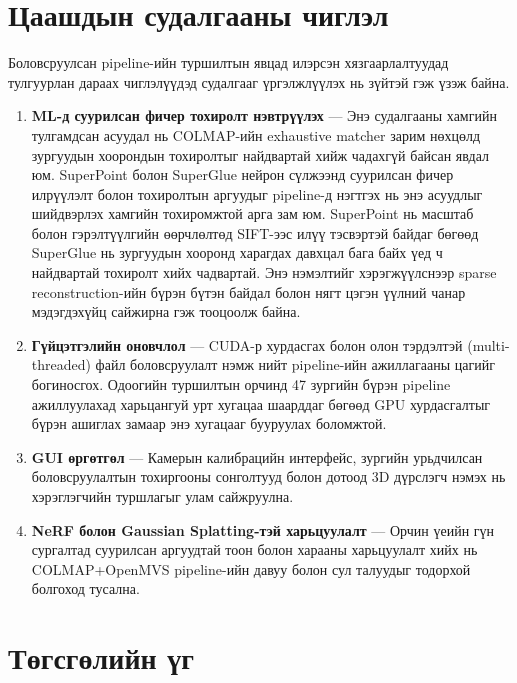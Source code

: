 \section{Цаашдын судалгааны чиглэл}

Боловсруулсан pipeline-ийн туршилтын явцад илэрсэн хязгаарлалтуудад тулгуурлан 
дараах чиглэлүүдэд судалгааг үргэлжлүүлэх нь зүйтэй гэж үзэж байна.

\begin{enumerate}
    \item \textbf{ML-д суурилсан фичер тохиролт нэвтрүүлэх} — Энэ судалгааны хамгийн 
    тулгамдсан асуудал нь COLMAP-ийн exhaustive matcher зарим нөхцөлд зургуудын 
    хоорондын тохиролтыг найдвартай хийж чадахгүй байсан явдал юм. SuperPoint болон
    SuperGlue нейрон сүлжээнд суурилсан фичер илрүүлэлт болон тохиролтын аргуудыг
    pipeline-д нэгтгэх нь энэ асуудлыг шийдвэрлэх хамгийн тохиромжтой арга зам юм. 
    SuperPoint нь масштаб болон гэрэлтүүлгийн өөрчлөлтөд SIFT-ээс илүү тэсвэртэй 
    байдаг бөгөөд SuperGlue нь зургуудын хооронд харагдах давхцал бага байх үед ч 
    найдвартай тохиролт хийх чадвартай. Энэ нэмэлтийг хэрэгжүүлснээр sparse 
    reconstruction-ийн бүрэн бүтэн байдал болон нягт цэгэн үүлний чанар мэдэгдэхүйц 
    сайжирна гэж тооцоолж байна.

    \item \textbf{Гүйцэтгэлийн оновчлол} — CUDA-р хурдасгах болон олон тэрдэлтэй 
    (multi-threaded) файл боловсруулалт нэмж нийт pipeline-ийн ажиллагааны цагийг 
    богиносгох. Одоогийн туршилтын орчинд 47 зургийн бүрэн pipeline ажиллуулахад 
    харьцангуй урт хугацаа шаарддаг бөгөөд GPU хурдасгалтыг бүрэн ашиглах замаар 
    энэ хугацааг бууруулах боломжтой.

    \item \textbf{GUI өргөтгөл} — Камерын калибрацийн интерфейс, зургийн урьдчилсан 
    боловсруулалтын тохиргооны сонголтууд болон дотоод 3D дүрслэгч нэмэх нь 
    хэрэглэгчийн туршлагыг улам сайжруулна.

    \item \textbf{NeRF болон Gaussian Splatting-тэй харьцуулалт} — Орчин үеийн гүн 
    сургалтад суурилсан аргуудтай тоон болон харааны харьцуулалт хийх нь 
    COLMAP+OpenMVS pipeline-ийн давуу болон сул талуудыг тодорхой болгоход тусална.
\end{enumerate}

\section{Төгсгөлийн үг}

